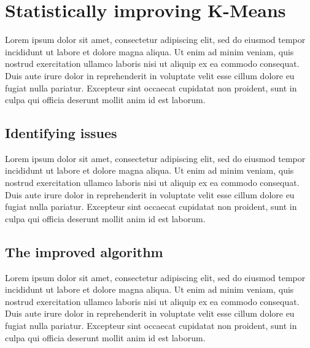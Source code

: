 \documentclass[10pt,twocolumn,letterpaper]{article}
\begin{document}

\section{Statistically improving K-Means}\label{sec:statistically-improving-k-means}

Lorem ipsum dolor sit amet, consectetur adipiscing elit, sed do eiusmod tempor
incididunt ut labore et dolore magna aliqua. Ut enim ad minim veniam, quis
nostrud exercitation ullamco laboris nisi ut aliquip ex ea commodo consequat.
Duis aute irure dolor in reprehenderit in voluptate velit esse cillum dolore eu
fugiat nulla pariatur. Excepteur sint occaecat cupidatat non proident, sunt in
culpa qui officia deserunt mollit anim id est laborum.


\subsection{Identifying issues}\label{subsec:identifying-issues}

Lorem ipsum dolor sit amet, consectetur adipiscing elit, sed do eiusmod tempor
incididunt ut labore et dolore magna aliqua. Ut enim ad minim veniam, quis
nostrud exercitation ullamco laboris nisi ut aliquip ex ea commodo consequat.
Duis aute irure dolor in reprehenderit in voluptate velit esse cillum dolore eu
fugiat nulla pariatur. Excepteur sint occaecat cupidatat non proident, sunt in
culpa qui officia deserunt mollit anim id est laborum.


\subsection{The improved algorithm}\label{subsec:the-improved-algorithm}

Lorem ipsum dolor sit amet, consectetur adipiscing elit, sed do eiusmod tempor
incididunt ut labore et dolore magna aliqua. Ut enim ad minim veniam, quis
nostrud exercitation ullamco laboris nisi ut aliquip ex ea commodo consequat.
Duis aute irure dolor in reprehenderit in voluptate velit esse cillum dolore eu
fugiat nulla pariatur. Excepteur sint occaecat cupidatat non proident, sunt in
culpa qui officia deserunt mollit anim id est laborum.
\end{document}
